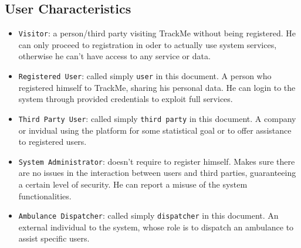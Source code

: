 \documentclass[12pt,a4paper]{article}
\begin{document}
		\subsection{User Characteristics}
		\begin{itemize}
			\item \texttt{Visitor}: a person/third party visiting TrackMe without being registered. He can only proceed to registration in oder to actually use system services, otherwise he can't have access to any service or data.
			\item \texttt{Registered User}: called simply \texttt{user} in this document. A person who registered himself to TrackMe, sharing his personal data. He can login to the system through provided credentials to exploit full services.
			\item \texttt{Third Party User}: called simply \texttt{third party} in this document. A company or invidual using the platform for some statistical goal or to offer assistance to registered users.
			\item \texttt{System Administrator}: doesn't require to register himself. Makes sure there are no issues in the interaction between users and third parties, guaranteeing a certain level of security. He can report a misuse of the system functionalities.
			\item \texttt{Ambulance Dispatcher}: called simply \texttt{dispatcher} in this document. An external individual to the system, whose role is to dispatch an ambulance to assist specific users.
		\end{itemize}

\end{document}

